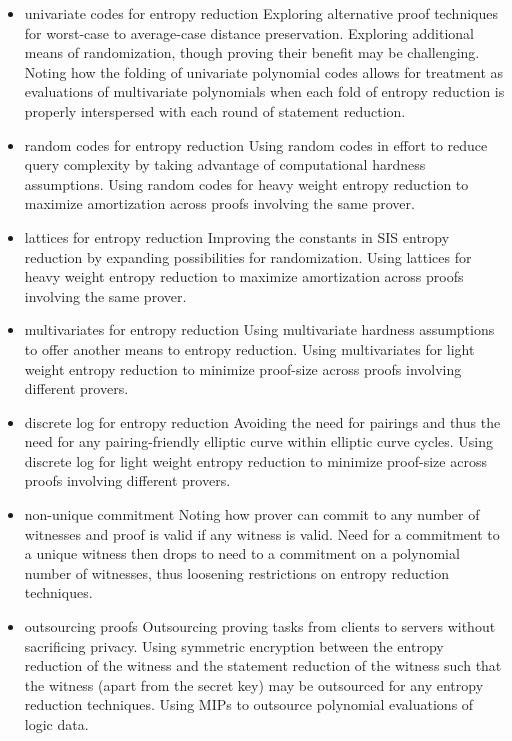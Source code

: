\begin{itemize}
    \item{univariate codes for entropy reduction}
    Exploring alternative proof techniques for worst-case to average-case distance preservation.
    Exploring additional means of randomization, though proving their benefit may be challenging.
    Noting how the folding of univariate polynomial codes allows for treatment as evaluations of multivariate polynomials when each fold of entropy reduction is properly interspersed with each round of statement reduction.

    \item{random codes for entropy reduction}
    Using random codes in effort to reduce query complexity by taking advantage of computational hardness assumptions.
    Using random codes for heavy weight entropy reduction to maximize amortization across proofs involving the same prover.

    \item{lattices for entropy reduction}
    Improving the constants in SIS entropy reduction by expanding possibilities for randomization.
    Using lattices for heavy weight entropy reduction to maximize amortization across proofs involving the same prover.

    \item{multivariates for entropy reduction}
    Using multivariate hardness assumptions to offer another means to entropy reduction.
    Using multivariates for light weight entropy reduction to minimize proof-size across proofs involving different provers.

    \item{discrete log for entropy reduction}
    Avoiding the need for pairings and thus the need for any pairing-friendly elliptic curve within elliptic curve cycles.
    Using discrete log for light weight entropy reduction to minimize proof-size across proofs involving different provers.

    \item{non-unique commitment}
    Noting how prover can commit to any number of witnesses and proof is valid if any witness is valid.
    Need for a commitment to a unique witness then drops to need to a commitment on a polynomial number of witnesses, thus loosening restrictions on entropy reduction techniques.

    \item{outsourcing proofs}
    Outsourcing proving tasks from clients to servers without sacrificing privacy. 
    Using symmetric encryption between the entropy reduction of the witness and the statement reduction of the witness such that the witness (apart from the secret key) may be outsourced for any entropy reduction techniques.
    Using MIPs to outsource polynomial evaluations of logic data.


\end{itemize}

